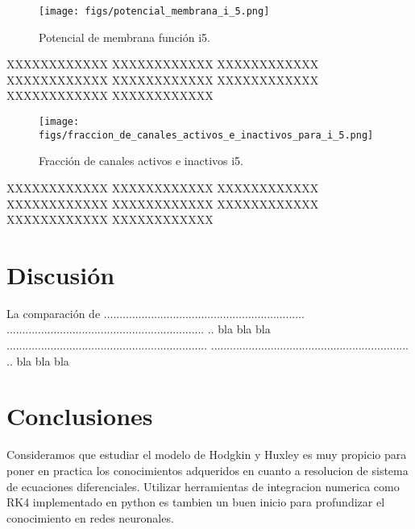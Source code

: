 \documentclass[aps,prl,twocolumn,groupedaddress]{revtex4-2}
\begin{document}
\begin{figure}[h!]
\centering
\texttt{[image: figs/potencial\_membrana\_i\_5.png]}
\caption{Potencial de membrana función i5. \label{fig9}}
\end{figure}



XXXXXXXXXXXX
XXXXXXXXXXXX
XXXXXXXXXXXX
XXXXXXXXXXXX
XXXXXXXXXXXX
XXXXXXXXXXXX
XXXXXXXXXXXX
XXXXXXXXXXXX



\begin{figure}[h!]
\centering
\texttt{[image: figs/fraccion\_de\_canales\_activos\_e\_inactivos\_para\_i\_5.png]}
\caption{Fracción de canales activos e inactivos i5. \label{fig10}}
\end{figure}



XXXXXXXXXXXX
XXXXXXXXXXXX
XXXXXXXXXXXX
XXXXXXXXXXXX
XXXXXXXXXXXX
XXXXXXXXXXXX
XXXXXXXXXXXX
XXXXXXXXXXXX



\section{Discusión}

La comparación de ................................................................
...............................................................
.. bla bla bla ................................................................
...............................................................
.. bla bla bla

\section{Conclusiones}

Consideramos que estudiar el modelo de Hodgkin y Huxley es muy propicio para poner en practica los conocimientos adqueridos en cuanto a resolucion de sistema de ecuaciones diferenciales. Utilizar herramientas de integracion numerica como RK4 implementado en python es tambien un buen inicio para profundizar el conocimiento en redes neuronales.


\end{document}
